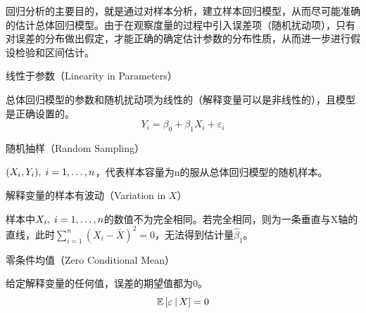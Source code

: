 \documentclass[11pt]{article}
\begin{document}
回归分析的主要目的，就是通过对样本分析，建立样本回归模型，从而尽可能准确的估计总体回归模型。由于在观察度量的过程中引入误差项（随机扰动项），只有对误差的分布做出假定，才能正确的确定估计参数的分布性质，从而进一步进行假设检验和区间估计。

\begin{assumption}
    线性于参数（Linearity in Parameters）

    总体回归模型的参数和随机扰动项为线性的（解释变量可以是非线性的），且模型是正确设置的。
    \begin{equation*}
        Y_i = \beta_0 + \beta_1 X_i + \varepsilon_i
    \end{equation*}

    \label{ols-assumnption-1}
\end{assumption}

\begin{assumption}
    随机抽样（Random Sampling）

    $(X_i,Y_i) ,\; i=1,\dots,n$，代表样本容量为n的服从总体回归模型的随机样本。

    \label{ols-assumnption-2}
\end{assumption}

\begin{assumption}
    解释变量的样本有波动（Variation in $X$）

    样本中$X_i ,\; i=1,\dots,n$的数值不为完全相同。若完全相同，则为一条垂直与X轴的直线，此时$\sum_{i=1}^{n} (X_i - \bar{X})^2 =0$，无法得到估计量$\hat{\beta}_1$。

    \label{ols-assumnption-3}
\end{assumption}

\begin{assumption}
    零条件均值（Zero Conditional Mean）

    给定解释变量的任何值，误差的期望值都为0。
    \begin{equation*}
        \mathbb{E}\left[ \varepsilon \:\vert\, X \right] = 0
    \end{equation*}

    \label{ols-assumnption-4}
\end{assumption}
\end{document}
